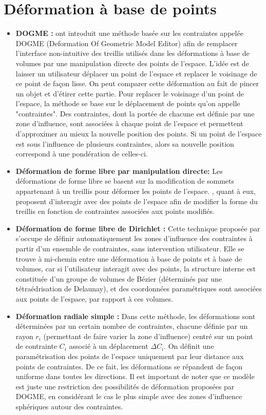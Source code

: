 \section{Déformation à base de points}
\begin{itemize}
\item{\textbf{DOGME :}} \cite{BB91} ont introduit une méthode basée
  sur les contraintes appelée DOGME (Deformation Of Geometric Model
  Editor) afin de remplacer l'interface non-intuitive des treillis
  utilisés dans les déformations à base de volumes par une
  manipulation directe des points de l'espace. L'idée est de laisser
  un utilisateur déplacer un point de l'espace et replacer le
  voisinage de ce point de façon lisse. On peut comparer cette
  déformation au fait de pincer un objet et d'étirer cette
  partie. Pour replacer le voisinage d'un point de l'espace, la
  méthode se base sur le déplacement de points qu'on appelle
  "contraintes". Des contraintes, dont la portée de chacune est
  définie par une zone d'influence, sont associées à chaque point de
  l'espace et permettent d'approximer au mieux la nouvelle position
  des points. Si un point de l'espace est sous l'influence de
  plusieurs contraintes, alors sa nouvelle position correspond à une
  pondération de celles-ci.
\item{\textbf{Déformation de forme libre par manipulation directe:}}
  Les déformations de forme libre se basent sur la modification de
  sommets appartenant à un treillis pour déformer les points de
  l'espace. \cite{HHK92}, quant à eux, proposent d'interagir avec des
  points de l'espace afin de modifier la forme du treillis en fonction
  de contraintes associées aux points modifiés.
\item{\textbf{Déformation de forme libre de Dirichlet :}} Cette
  technique proposée par \cite{MT97} s'occupe de définir
  automatiquement les zones d'influence des contraintes à partir d'un
  ensemble de contraintes, sans intervention utilisateur. Elle se
  trouve à mi-chemin entre une déformation à base de points et à base
  de volumes, car si l'utilisateur interagit avec des points, la
  structure interne est constituée d'un groupe de volumes de Bézier
  (déterminés par une tétraédrisation de Delaunay), et des coordonnées
  paramétriques sont associées aux points de l'espace, par rapport à
  ces volumes.
\item{\textbf{Déformation radiale simple :}} Dans cette méthode, les
  déformations sont déterminées par un certain nombre de contraintes,
  chacune définie par un rayon $r_i$ (permettant de faire varier la
  zone d'influence) centré sur un point de contrainte $C_i$ associé à
  un déplacement $\Delta C_i$. On définit une paramétrisation des
  points de l'espace uniquement par leur distance aux points de
  contraintes. De ce fait, les déformations se répandent de façon
  uniforme dans toutes les directions. Il est important de noter que
  ce modèle est juste une restriction des possibilités de déformation
  proposées par DOGME, en considérant le cas le plus simple avec des
  zones d'influence sphériques autour des contraintes.
\end{itemize}


